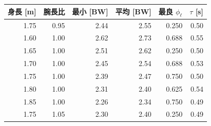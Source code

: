 \begin{tabular}{rrrrrr}
\toprule
身長 [m] & 腕長比 & 最小 [BW] & 平均 [BW] & 最良 $\phi_\ell$ & $\tau$ [s] \\
\midrule
1.75 & 0.95 & 2.44 & 2.55 & 0.250 & 0.50 \\
1.60 & 1.00 & 2.62 & 2.73 & 0.688 & 0.55 \\
1.65 & 1.00 & 2.51 & 2.62 & 0.250 & 0.50 \\
1.70 & 1.00 & 2.45 & 2.54 & 0.688 & 0.53 \\
1.75 & 1.00 & 2.39 & 2.47 & 0.750 & 0.50 \\
1.80 & 1.00 & 2.31 & 2.40 & 0.625 & 0.54 \\
1.85 & 1.00 & 2.26 & 2.34 & 0.750 & 0.49 \\
1.75 & 1.05 & 2.30 & 2.40 & 0.250 & 0.49 \\
\bottomrule
\end{tabular}

